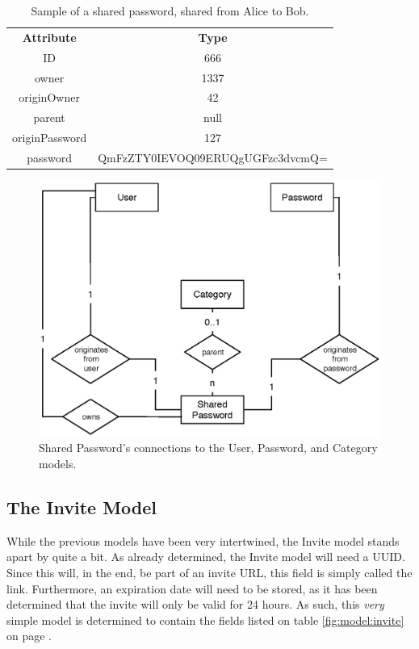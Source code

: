			\begin{table}[p]
				\centering
				\begin{tabular}{c|c}
					\textbf{Attribute} 		& \textbf{Type} 											\\
					ID 						& 666 														\\
					owner 					& 1337 														\\
					originOwner 			& 42 														\\
					parent 					& null 														\\
					originPassword			& 127 														\\
					password				& QmFzZTY0IEVOQ09ERUQgUGFzc3dvcmQ= 							\\
				\end{tabular}
				\caption{Sample of a shared password, shared from Alice to Bob.}
				\label{fig:example:sharedpassword:sampleshare}
			\end{table}

			\begin{figure}[p]
				\centering
				\includegraphics[scale=0.75]{figures/design/uml/erd/user-category-password-sharedpassword.eps}
				\caption{Shared Password's connections to the User, Password, and Category models.}
				\label{fig:relationship:sharedpassword}
			\end{figure}

		\subsection{The Invite Model}
			While the previous models have been very intertwined, the Invite model stands apart by quite a bit. As already determined, the Invite model will need a UUID. Since this will, in the end, be part of an invite URL, this field is simply called the link. Furthermore, an expiration date will need to be stored, as it has been determined that the invite will only be valid for 24 hours. As such, this \emph{very} simple model is determined to contain the fields listed on table \ref{fig:model:invite} on page \pageref{fig:model:invite}. 
			
